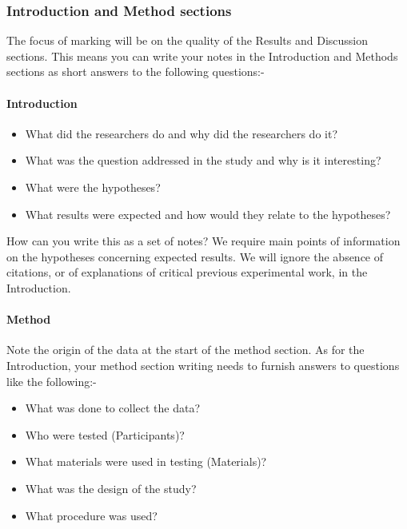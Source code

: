 \documentclass[
  letterpaper,
  DIV=11,
  numbers=noendperiod]{scrreprt}
\let\oldparagraph\paragraph
\renewcommand{\paragraph}[1]{\oldparagraph{#1}\mbox{}}
\providecommand{\tightlist}{%
  \setlength{\itemsep}{0pt}\setlength{\parskip}{0pt}}\usepackage{longtable,booktabs,array}
\begin{document}
\hypertarget{sec-what-content-intro-methods}{%
\subsubsection{Introduction and Method
sections}\label{sec-what-content-intro-methods}}

The focus of marking will be on the quality of the Results and
Discussion sections. This means you can write your notes in the
Introduction and Methods sections as short answers to the following
questions:-

\hypertarget{sec-what-content-intro}{%
\paragraph{Introduction}\label{sec-what-content-intro}}

\begin{itemize}
\tightlist
\item
  What did the researchers do and why did the researchers do it?
\item
  What was the question addressed in the study and why is it
  interesting?
\item
  What were the hypotheses?
\item
  What results were expected and how would they relate to the
  hypotheses?
\end{itemize}

How can you write this as a set of notes? We require main points of
information on the hypotheses concerning expected results. We will
ignore the absence of citations, or of explanations of critical previous
experimental work, in the Introduction.

\hypertarget{sec-what-content-method}{%
\paragraph{Method}\label{sec-what-content-method}}

Note the origin of the data at the start of the method section. As for
the Introduction, your method section writing needs to furnish answers
to questions like the following:-

\begin{itemize}
\tightlist
\item
  What was done to collect the data?
\item
  Who were tested (Participants)?
\item
  What materials were used in testing (Materials)?
\item
  What was the design of the study?
\item
  What procedure was used?
\end{itemize}
\end{document}
